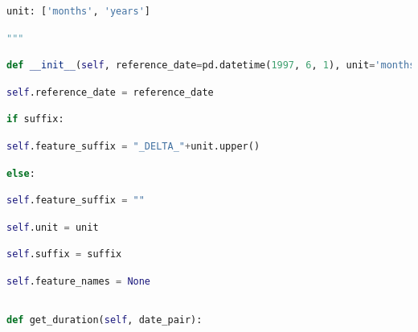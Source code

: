 \documentclass[
  11pt,
  a4paper,
  DIV=12,captions=tableheading,oneside]{scrbook}
\begin{document}
\begin{lstlisting}[language=Python,stepnumber=2,basicstyle=\footnotesize]
    unit: ['months', 'years']\end{lstlisting}
\begin{lstlisting}[language=Python,stepnumber=2,basicstyle=\footnotesize]
    """\end{lstlisting}
\begin{lstlisting}[language=Python,stepnumber=2,basicstyle=\footnotesize]
    def __init__(self, reference_date=pd.datetime(1997, 6, 1), unit='months',suffix=True):\end{lstlisting}
\begin{lstlisting}[language=Python,stepnumber=2,basicstyle=\footnotesize]
        self.reference_date = reference_date\end{lstlisting}
\begin{lstlisting}[language=Python,stepnumber=2,basicstyle=\footnotesize]
        if suffix:\end{lstlisting}
\begin{lstlisting}[language=Python,stepnumber=2,basicstyle=\footnotesize]
            self.feature_suffix = "_DELTA_"+unit.upper()\end{lstlisting}
\begin{lstlisting}[language=Python,stepnumber=2,basicstyle=\footnotesize]
        else:\end{lstlisting}
\begin{lstlisting}[language=Python,stepnumber=2,basicstyle=\footnotesize]
            self.feature_suffix = ""\end{lstlisting}
\begin{lstlisting}[language=Python,stepnumber=2,basicstyle=\footnotesize]
        self.unit = unit\end{lstlisting}
\begin{lstlisting}[language=Python,stepnumber=2,basicstyle=\footnotesize]
        self.suffix = suffix\end{lstlisting}
\begin{lstlisting}[language=Python,stepnumber=2,basicstyle=\footnotesize]
        self.feature_names = None\end{lstlisting}
\begin{lstlisting}[language=Python,stepnumber=2,basicstyle=\footnotesize]
\end{lstlisting}
\begin{lstlisting}[language=Python,stepnumber=2,basicstyle=\footnotesize]
    def get_duration(self, date_pair):\end{lstlisting}
\end{document}
